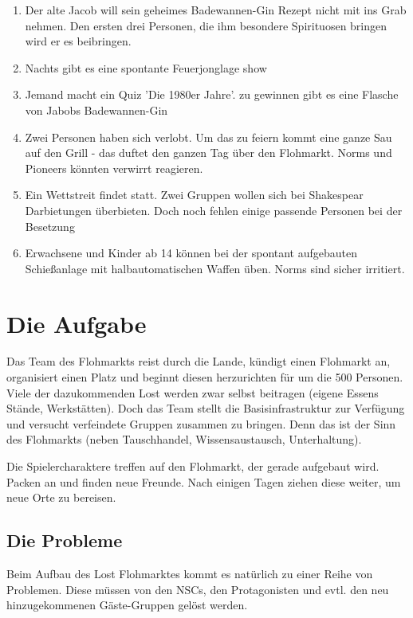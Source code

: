 \begin{enumerate}
    \item Der alte Jacob will sein geheimes Badewannen-Gin Rezept nicht mit ins Grab nehmen. Den ersten drei Personen, die ihm besondere Spirituosen bringen wird er es beibringen.
    \item Nachts gibt es eine spontante Feuerjonglage show
    \item Jemand macht ein Quiz 'Die 1980er Jahre'. zu gewinnen gibt es eine Flasche von Jabobs Badewannen-Gin
    \item Zwei Personen haben sich verlobt. Um das zu feiern kommt eine ganze Sau auf den Grill - das duftet den ganzen Tag über den Flohmarkt. Norms und Pioneers könnten verwirrt reagieren.
    \item Ein Wettstreit findet statt. Zwei Gruppen wollen sich bei Shakespear Darbietungen überbieten. Doch noch fehlen einige passende Personen bei der Besetzung
    \item Erwachsene und Kinder ab 14 können bei der spontant aufgebauten Schießanlage mit halbautomatischen Waffen üben. Norms sind sicher irritiert.
\end{enumerate}


\chapter{Die Aufgabe}

Das Team des Flohmarkts reist durch die Lande, kündigt einen Flohmarkt an, organisiert einen Platz und beginnt diesen herzurichten für um die 500 Personen. Viele der dazukommenden Lost werden zwar selbst beitragen (eigene Essens Stände, Werkstätten).
Doch das Team stellt die Basisinfrastruktur zur Verfügung und versucht verfeindete Gruppen zusammen zu bringen. Denn das ist der Sinn des Flohmarkts (neben Tauschhandel, Wissensaustausch, Unterhaltung).

Die Spielercharaktere treffen auf den Flohmarkt, der gerade aufgebaut wird. Packen an und finden neue Freunde. Nach einigen Tagen ziehen diese weiter, um neue Orte zu bereisen.

\section{Die Probleme}

Beim Aufbau des Lost Flohmarktes kommt es natürlich zu einer Reihe von Problemen. Diese müssen von den NSCs, den Protagonisten und evtl. den neu hinzugekommenen Gäste-Gruppen gelöst werden.

